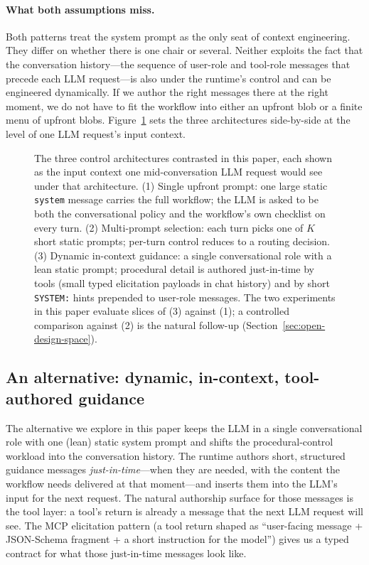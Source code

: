 \documentclass[11pt,a4paper]{article}
\begin{document}
\paragraph{What both assumptions miss.}
Both patterns treat the system prompt as the only seat of context engineering. They differ on whether there is one chair or several. Neither exploits the fact that the conversation history---the sequence of user-role and tool-role messages that precede each LLM request---is also under the runtime's control and can be engineered dynamically. If we author the right messages there at the right moment, we do not have to fit the workflow into either an upfront blob or a finite menu of upfront blobs. Figure~\ref{fig:three-architectures} sets the three architectures side-by-side at the level of one LLM request's input context.

\begin{figure}[htbp]
  \centering
  \resizebox{\linewidth}{!}{}
  \caption{The three control architectures contrasted in this paper, each
  shown as the input context one mid-conversation LLM request would see
  under that architecture. (1) Single upfront prompt: one large static
  \texttt{system} message carries the full workflow; the LLM is asked to be
  both the conversational policy and the workflow's own checklist on every
  turn. (2) Multi-prompt selection: each turn picks one of $K$ short static
  prompts; per-turn control reduces to a routing decision. (3) Dynamic
  in-context guidance: a single conversational role with a lean static
  prompt; procedural detail is authored just-in-time by tools (small typed
  elicitation payloads in chat history) and by short \texttt{SYSTEM:} hints
  prepended to user-role messages. The two experiments in this paper
  evaluate slices of (3) against (1); a controlled comparison against (2)
  is the natural follow-up (Section~\ref{sec:open-design-space}).}
  \label{fig:three-architectures}
\end{figure}

\subsection{An alternative: dynamic, in-context, tool-authored guidance}

The alternative we explore in this paper keeps the LLM in a single conversational role with one (lean) static system prompt and shifts the procedural-control workload into the conversation history. The runtime authors short, structured guidance messages \emph{just-in-time}---when they are needed, with the content the workflow needs delivered at that moment---and inserts them into the LLM's input for the next request. The natural authorship surface for those messages is the tool layer: a tool's return is already a message that the next LLM request will see. The MCP elicitation pattern (a tool return shaped as ``user-facing message + JSON-Schema fragment + a short instruction for the model'') gives us a typed contract for what those just-in-time messages look like.
\end{document}

